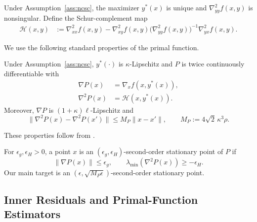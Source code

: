 Under Assumption~\ref{ass:ncsc}, the maximizer $y^*(x)$ is unique and
$\nabla^2_{yy}f(x,y)$ is nonsingular. Define the Schur-complement map
\begin{equation}
\begin{aligned}
    \mathcal H(x,y)
    &:=
    \nabla^2_{xx}f(x,y)
    -
    \nabla^2_{xy}f(x,y)
    \bigl(\nabla^2_{yy}f(x,y)\bigr)^{-1}
    \nabla^2_{yx}f(x,y).
\end{aligned}
\label{eq:schur-definition}
\end{equation}

We use the following standard properties of the primal function.

\begin{lemma}
\label{lem:primal-geometry}
Under Assumption~\ref{ass:ncsc}, $y^*(\cdot)$ is
$\kappa$-Lipschitz and $P$ is twice continuously differentiable with
\begin{subequations}
\label{eq:primal-derivatives}
\begin{align}
    \nabla P(x)
    &=
    \nabla_x f(x,y^*(x)),
    \label{eq:primal-gradient}
    \\
    \nabla^2P(x)
    &=
    \mathcal H(x,y^*(x)).
    \label{eq:primal-hessian}
\end{align}
\end{subequations}
Moreover, $\nabla P$ is $(1+\kappa)\ell$-Lipschitz and
\begin{equation}
    \|\nabla^2P(x)-\nabla^2P(x')\|
    \le
    M_P\|x-x'\|,
    \qquad
    M_P:=4\sqrt{2}\,\kappa^3\rho.
    \label{eq:primal-hessian-lipschitz}
\end{equation}
\end{lemma}

These properties follow from
\citet[Lemmas~1--3]{luo2022finding}.

\begin{definition}
\label{def:sosp}
For $\epsilon_g,\epsilon_H>0$, a point $x$ is an
$(\epsilon_g,\epsilon_H)$-second-order stationary point of $P$ if
\begin{equation}
    \|\nabla P(x)\|\le\epsilon_g,
    \qquad
    \lambda_{\min}(\nabla^2P(x))\ge-\epsilon_H.
    \label{eq:sosp}
\end{equation}
Our main target is an
$(\epsilon,\sqrt{M_P\epsilon})$-second-order stationary point.
\end{definition}


\subsection{Inner Residuals and Primal-Function Estimators}
\label{sec:corrected-estimators}

